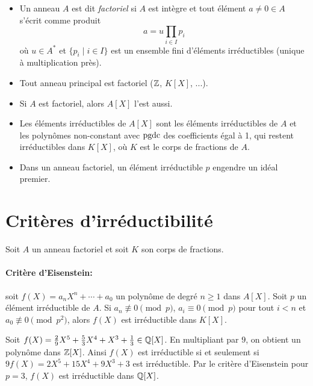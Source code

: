 \begin{itemize}
\item Un anneau $A$ est dit \emph{factoriel} si $A$ est intègre et tout élément $a \neq 0 \in A$ s'écrit comme
  produit 
  \[ a = u \prod_{i \in I} p_i \]
  où $u \in A^\ast$ et $\{p_i \mid i \in I\}$ est un ensemble fini d'éléments irréductibles (unique à
  multiplication près).

\item Tout anneau principal est factoriel ($\mathbb{Z}$, $K[X]$, ...).

\item Si $A$ est factoriel, alors $A[X]$ l'est aussi.

\item Les éléments irréductibles de $A[X]$ sont les éléments irréductibles de $A$ et les polynômes
  non-constant avec $\mathrm{pgdc}$ des coefficients égal à 1, qui restent irréductibles dans $K[X]$, où $K$ est le
  corps de fractions de $A$.

\item Dans un anneau factoriel, un élément irréductible $p$ engendre un idéal premier. 

\end{itemize}





\section{Critères d'irréductibilité}

Soit $A$ un anneau factoriel et soit $K$ son corps de fractions. 

\paragraph{Critère d'Eisenstein:}

soit $f(X) = a_nX^n + \cdots + a_0$ un polynôme de degré $n \geq 1$ dans $A[X]$. Soit $p$ un
élément irréductible de $A$. Si $a_n \not \equiv 0 \pmod p$, $a_i \equiv 0 \pmod p$ pour tout $i < n$ et $a_0
\not \equiv 0 \pmod{p^2}$, alors $f(X)$ est irréductible dans $K[X]$.

\begin{ex}
  Soit $f(X) = \frac{2}{9} X^5 + \frac{5}{3} X^4 + X^3 + \frac{1}{3} \in \mathbb{Q}[X]$. En multipliant par $9$, on
  obtient un polynôme dans $\mathbb{Z}[X]$. Ainsi $f(X)$ est irréductible si et seulement si $9f(X) = 2X^5 + 15X^4 +
  9X^3 + 3$ est irréductible. Par le critère d'Eisenstein pour $p = 3$, $f(X)$ est irréductible dans $\mathbb{Q}[X]$.
\end{ex}

